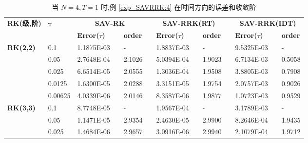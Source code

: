 \documentclass[aspectratio=169]{beamer}
\numberwithin{theorem}{section} %
\numberwithin{equation}{section}%
\numberwithin{figure}{section}%
\numberwithin{table}{section}%
\begin{document}
\begin{frame}%
	\begin{table}[H]\scriptsize
		\centering
		\caption{当 $N=4, T = 1$ 时,例 \ref{exp_SAVRRK:4} 在时间方向的误差和收敛阶}
		\begin{tabular}{lllllrlrlrlrlrl}
		\toprule
		\multicolumn{2}{l}{\multirow{2}[3]{*}{\textbf{RK(级,阶)}}} & \multicolumn{2}{l}{\multirow{2}[3]{*}{$\bm{\tau}$}} & \multicolumn{3}{c}{\textbf{SAV-RK}} &       & \multicolumn{3}{c}{\textbf{SAV-RRK(RT)}} &       & \multicolumn{3}{c}{\textbf{SAV-RRK(IDT)}} \\
		\cmidrule{5-7}\cmidrule{9-11}\cmidrule{13-15}    \multicolumn{2}{l}{} & \multicolumn{2}{l}{} & \textbf{Error($\tau$)} &       & \textbf{order} &       & \textbf{Error($\tau$)} &       & \textbf{order} &       & \textbf{Error($\tau$)} &       & \textbf{order} \\
		\hline
		\multicolumn{2}{l}{\multirow{5}[0]{*}{\textbf{RK(2,2)}}} & \multicolumn{2}{l}{0.1} & 1.1875E-03 &       & -     &       & 1.8837E-03 &       & -     &       & 9.5325E-03 &       & - \\
		\multicolumn{2}{l}{} & \multicolumn{2}{l}{0.05} & 2.7648E-04 &       & 2.1026  &       & 5.0394E-04 &       & 1.9023  &       & 6.7134E-03 &       & 0.5058  \\
		\multicolumn{2}{l}{} & \multicolumn{2}{l}{0.025} & 6.6514E-05 &       & 2.0555  &       & 1.3036E-04 &       & 1.9508  &       & 3.8805E-03 &       & 0.7908  \\
		\multicolumn{2}{l}{} & \multicolumn{2}{l}{0.0125} & 1.6300E-05 &       & 2.0288  &       & 3.3151E-05 &       & 1.9754  &       & 2.0757E-03 &       & 0.9026  \\
		\multicolumn{2}{l}{} & \multicolumn{2}{l}{0.00625} & 4.0339E-06 &       & 2.0146  &       & 8.3587E-06 &       & 1.9877  &       & 1.0723E-03 &       & 0.9529  \\
		\multicolumn{2}{l}{\multirow{5}[0]{*}{\textbf{RK(3,3)}}} & \multicolumn{2}{l}{0.1} & 8.7748E-05 &       & -     &       & 1.9567E-04 &       & -     &       & 3.1789E-03 &       & - \\
		\multicolumn{2}{l}{} & \multicolumn{2}{l}{0.05} & 1.1471E-05 &       & 2.9354  &       & 2.4630E-05 &       & 2.9900  &       & 8.2646E-04 &       & 1.9435  \\
		\multicolumn{2}{l}{} & \multicolumn{2}{l}{0.025} & 1.4684E-06 &       & 2.9657  &       & 3.0916E-06 &       & 2.9940  &       & 2.1079E-04 &       & 1.9712  \\

\end{tabular}
\end{table}
\end{frame}
\end{document}
